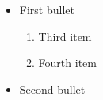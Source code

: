 \documentclass{article}
\begin{document}
\begin{itemize}
\item First bullet
\begin{enumerate}[start=3]
\item Third item
\item Fourth item
\end{enumerate}
\item Second bullet
\end{itemize}
\end{document}
